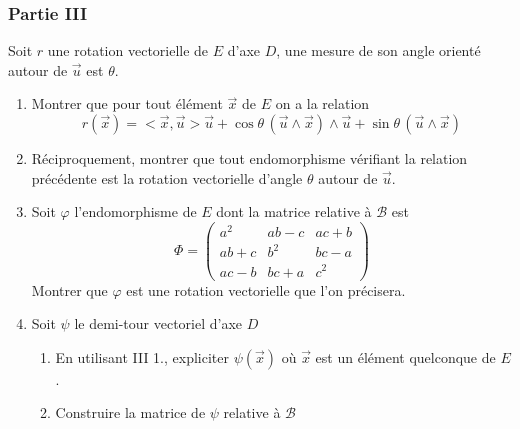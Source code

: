\subsubsection*{Partie III}
Soit $r$ une rotation vectorielle de $E$ d'axe $D$, une mesure de son angle orient{\'e} autour de $\overrightarrow{u}$ est $\theta$.
\begin{enumerate}
  \item Montrer que pour tout {\'e}l{\'e}ment $\overrightarrow{x}$ de $E$  on a la relation
  \[r(\overrightarrow{x})
    =<\overrightarrow{x},\overrightarrow{u}> \overrightarrow{u}
     + \cos \theta \,(\overrightarrow{u}\wedge\overrightarrow{x})\wedge \overrightarrow{u}
     + \sin \theta \,(\overrightarrow{u}\wedge\overrightarrow{x})\]
  \item R{\'e}ciproquement, montrer que tout endomorphisme v{\'e}rifiant la relation pr{\'e}c{\'e}dente est la rotation vectorielle d'angle $\theta$ autour de $\overrightarrow{u}$.
  \item Soit $\varphi$ l'endomorphisme de $E$ dont la matrice relative {\`a} $\mathcal{B}$ est
  \[\Phi=\begin{pmatrix}
    a^2 & ab-c & ac+b \\
    ab+c & b^2 & bc-a \\
    ac-b & bc+a & c^2 \
  \end{pmatrix}\]
  Montrer que $\varphi$ est une rotation vectorielle que l'on  pr{\'e}cisera.
  \item Soit $\psi$ le demi-tour vectoriel d'axe $D$
\begin{enumerate}
  \item En utilisant III 1., expliciter $\psi(\overrightarrow{x})$  o{\`u} $\overrightarrow{x}$ est un {\'e}l{\'e}ment quelconque de $E$.
  \item Construire la matrice de $\psi$ relative {\`a} $\mathcal{B}$
\end{enumerate}

\end{enumerate}


